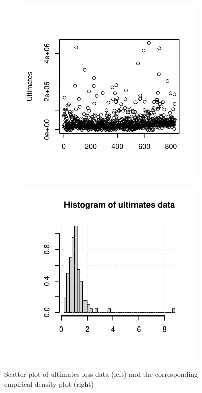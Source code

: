 \begin{figure}[h!]
\centering
	\begin{subfigure}[h]{0.49\linewidth}
\includegraphics[width=\textwidth]{./plots/chapter2_plots/ultimates.pdf}
\end{subfigure}
			\begin{subfigure}[h]{0.49\linewidth}
\includegraphics[width=\textwidth]{./plots/chapter2_plots/mtpl_dens.pdf}
\end{subfigure}
\caption{Scatter plot of ultimates loss data (left) and the corresponding empirical density plot (right)}
\label{fig:hist}
\end{figure}
